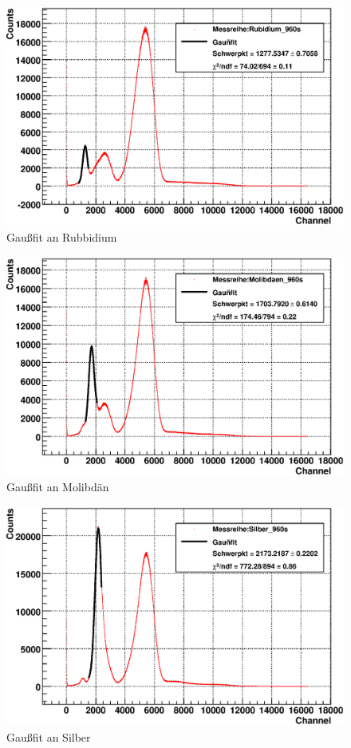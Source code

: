 \documentclass[12pt]{article}
\begin{document}
\begin{figure}[H]
 \includegraphics[width=0.9\linewidth]{pictures/eichung_rubidium.eps}
 \caption{Gaußfit an Rubbidium}
\end{figure}
\begin{figure}[H]
 \includegraphics[width=0.9\linewidth]{pictures/eichung_molibdaen.eps}
 \caption{Gaußfit an Molibdän}
\end{figure}
\begin{figure}[H]
 \includegraphics[width=0.9\linewidth]{pictures/eichung_silber.eps}
 \caption{Gaußfit an Silber}
\end{figure}
\end{document}
